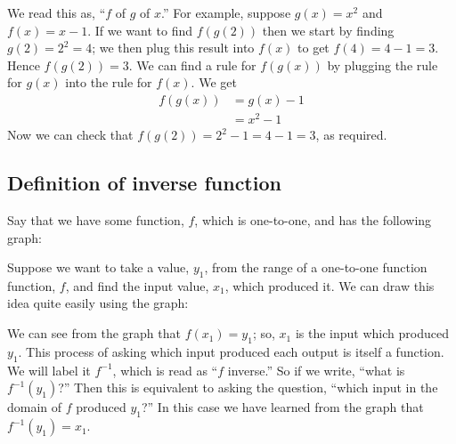 \bigskip

\hfil{}
\bigskip

\noindent We read this as, ``$f$ of $g$ of $x$.'' For example, suppose $g(x) = x^2$ and $f(x) = x-1$. If we want to find $f(g(2))$ then we start by finding $g(2) = 2^2 = 4$; we then plug this result into $f(x)$ to get $f(4) = 4 - 1 = 3$. Hence $f(g(2)) = 3$. We can find a rule for $f(g(x))$ by plugging the rule for $g(x)$ into the rule for $f(x)$. We get
\begin{align*}
f(g(x)) & = g(x) - 1 \tag{since $f(x) = x-1$} \\
	 & = x^2 - 1 \tag{since $g(x) = x^2$}
\end{align*}
Now we can check that $f(g(2)) = 2^2 - 1 = 4 - 1 = 3$, as required.

\subsection{Definition of inverse function}
Say that we have some function, $f$, which is one-to-one, and has the following graph:
\begin{center}
\end{center}
\noindent Suppose we want to take a value, $y_1$, from the range of a one-to-one function function, $f$, and find the input value, $x_1$, which produced it. We can draw this idea quite easily using the graph:
\begin{center}
\end{center}
We can see from the graph that $f(x_1) = y_1$; so, $x_1$ is the input which produced $y_1$. This process of asking which input produced each output is itself a function. We will label it $f^{-1}$, which is read as ``$f$ inverse.'' So if we write, ``what is $f^{-1}(y_1)$?'' Then this is equivalent to asking the question, ``which input in the domain of $f$ produced $y_1$?'' In this case we have learned from the graph that $f^{-1}(y_1) = x_1$. \\

